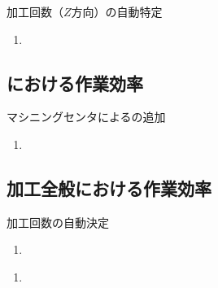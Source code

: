 \begin{Issues}{加工回数（$Z$方向）の自動特定\TBW}
\begin{enumerate}[label=\sarrow]
\item[{\sarrow[red]}]
\end{enumerate}
\end{Issues}


\subsection{\EndFaceChamferMilling における作業効率}

\begin{Issues}{マシニングセンタによる\EndFaceChamferMilling の追加\TBW}
\begin{enumerate}[label=\sarrow]
\item[{\sarrow[red]}]
\end{enumerate}
\end{Issues}


\subsection{加工全般における作業効率}

\begin{Issues}{加工回数の自動決定\TBW}
\begin{enumerate}[label=\sarrow]
\item[{\sarrow[red]}]
\end{enumerate}
\end{Issues}

\begin{Issues}{\TBW}
\begin{enumerate}[label=\sarrow]
\item[{\sarrow[red]}]
\end{enumerate}
\end{Issues}


\clearpage

